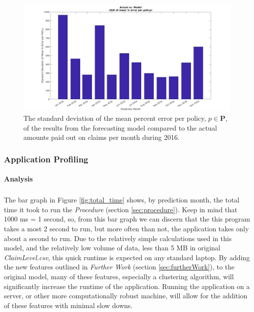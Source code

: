 \documentclass[12pt,letterpaper,titlepage]{article}
\begin{document}
			\begin{figure}[!ht]
			\centering
				\includegraphics[scale=0.32]{actual_vs_model_StDmeanPE.png}
				\caption{The standard deviation of the mean percent error per policy, $p \in \mathbf{P}$, of the results from the forecasting model compared to the actual amounts paid out on claims per month during 2016.}
				\label{fig:actual_vs_model_StDmeanPE}
			\end{figure}
			\FloatBarrier
				
\newpage				
			\subsubsection{Application Profiling}\label{sec:appProfiling}
			
			\paragraph*{Analysis} 
			\subparagraph*{}The bar graph in Figure \ref{fig:total_time} shows, by prediction month, the total time it took to run the \emph{Procedure} (section \ref{sec:procedure}). Keep in mind that 1000 ms =  1 second, so, from this bar graph we can discern that the this program takes a most 2 second to run, but more often than not, the application takes only about a second to run. Due to the relatively simple calculations used in this model, and the relatively low volume of data, less than 5 MB in original \emph{ClaimLevel.csv}, this quick runtime is expected on any standard laptop. By adding the new features outlined in \emph{Further Work} (section \ref{sec:furtherWork}), to the original model, many of these features, especially a clustering algorithm, will significantly increase the runtime of the application. Running the application on a server, or other more computationally robust machine, will allow for the addition of these features with minimal slow downs.
						
\end{document}
